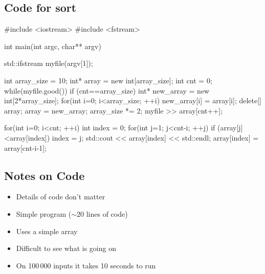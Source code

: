 

\begin{slide}
\section{Code for sort}
\pausebuild

\vspace*{-1cm}
\begin{cpp}
#include <iostream>
#include <fstream>

int main(int argc, char** argv) {
  std::ifstream myfile(argv[1]); 

  int array_size = 10;
  int* array = new int[array_size];
  int cnt = 0;
  while(myfile.good()) {
    if (cnt==array_size) {
      int* new_array = new int[2*array_size];
      for(int i=0; i<array_size; ++i)
	new_array[i] = array[i];
      delete[] array;
      array = new_array;
      array_size *= 2;
    }
    myfile >> array[cnt++];
  }



  
  for(int i=0; i<cnt; ++i) {
    int index = 0;
    for(int j=1; j<cnt-i; ++j) {
      if (array[j]<array[index])
	index = j;
    }
    std::cout << array[index] << std::endl;
    array[index] = array[cnt-i-1];
  }
}

\end{cpp}
\vspace*{-1cm}\pause\vspace{-0.5cm}
\end{slide}


\begin{slide}
\section{Notes on Code}

\begin{PauseHighLight}
  \begin{itemize}
  \item Details of code don't matter\pause
  \item Simple program ($\sim20$ lines of code)\pause
  \item Uses a simple array\pause
  \item Difficult to see what is going on\pause
  \item On 100\,000 inputs it takes 10 seconds to run\pause
  \end{itemize}
\end{PauseHighLight}

\end{slide}



